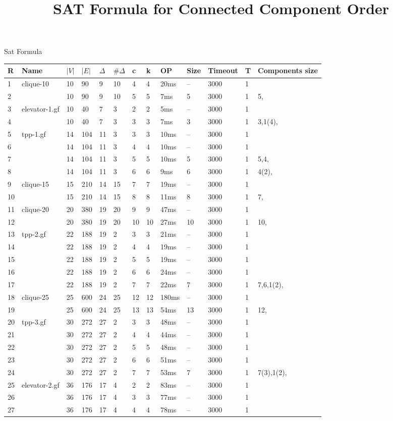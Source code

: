 \documentclass{article}
\title{SAT Formula for Connected Component Order}
\begin{document}
\maketitle
Sat Formula
\begin{longtable}{|l |l |l |l |l |l |l |l |l |l |l |l |l |}
\hline
R&Name&$|V|$&$|E|$&$\Delta$&$\# \Delta$&c&k&OP&Size&Timeout&T&Components size\\
\hline
1&clique-10&10&90&9&10&4&4&20ms&--&3000&1&\\
2&&10&90&9&10&5&5&7ms&5&3000&1&5,\\
3&elevator-1.gf&10&40&7&3&2&2&5ms&--&3000&1&\\
4&&10&40&7&3&3&3&7ms&3&3000&1&3,1(4),\\
5&tpp-1.gf&14&104&11&3&3&3&10ms&--&3000&1&\\
6&&14&104&11&3&4&4&10ms&--&3000&1&\\
7&&14&104&11&3&5&5&10ms&5&3000&1&5,4,\\
8&&14&104&11&3&6&6&9ms&6&3000&1&4(2),\\
9&clique-15&15&210&14&15&7&7&19ms&--&3000&1&\\
10&&15&210&14&15&8&8&11ms&8&3000&1&7,\\
11&clique-20&20&380&19&20&9&9&47ms&--&3000&1&\\
12&&20&380&19&20&10&10&27ms&10&3000&1&10,\\
13&tpp-2.gf&22&188&19&2&3&3&21ms&--&3000&1&\\
14&&22&188&19&2&4&4&19ms&--&3000&1&\\
15&&22&188&19&2&5&5&19ms&--&3000&1&\\
16&&22&188&19&2&6&6&24ms&--&3000&1&\\
17&&22&188&19&2&7&7&22ms&7&3000&1&7,6,1(2),\\
18&clique-25&25&600&24&25&12&12&180ms&--&3000&1&\\
19&&25&600&24&25&13&13&54ms&13&3000&1&12,\\
20&tpp-3.gf&30&272&27&2&3&3&48ms&--&3000&1&\\
21&&30&272&27&2&4&4&44ms&--&3000&1&\\
22&&30&272&27&2&5&5&48ms&--&3000&1&\\
23&&30&272&27&2&6&6&51ms&--&3000&1&\\
24&&30&272&27&2&7&7&53ms&7&3000&1&7(3),1(2),\\
25&elevator-2.gf&36&176&17&4&2&2&83ms&--&3000&1&\\
26&&36&176&17&4&3&3&77ms&--&3000&1&\\
27&&36&176&17&4&4&4&78ms&--&3000&1&\\

\end{longtable}
\end{document}
